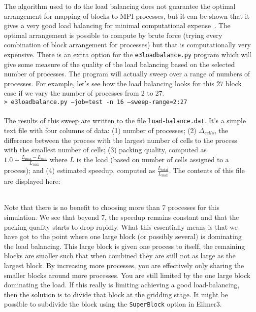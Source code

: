 The algorithm used to do the load balancing does not guarantee the
optimal arrangement for mapping of blocks to MPI processes,
but it can be shown that it gives a very good load balancing for
minimal computational expense~\cite{graham_1969}.
The optimal arrangement is possible to compute by brute force (trying
every combination of block arrangement for processes) but
that is computationally very expensive.
There is an extra option for the \texttt{e3loadbalance.py}
program which will give some measure of the quality of
the load balancing based on the selected number of
processes.
The program will actually sweep over a range of
numbers of processes.
For example, let's see how the load balancing looks
for this 27 block case if we vary the number
of processes from 2 to 27.
%
\topbar\\
\texttt{> e3loadbalance.py --job=test -n 16 --sweep-range=2:27}\\
\bottombar\\
%
The results of this sweep are written to the file \texttt{load-balance.dat}.
It's a simple text file with four columns of data:
(1) number of processes;
(2) $\Delta_{cells}$, the difference between
the process with the largest number of cells to the process
with the smallest number of cells;
(3) packing quality, computed as $1.0 - \frac{L_{\text{max}} - L_{\text{min}}}{L_{\text{max}}}$
where $L$ is the load (based on number of cells assigned to a process);
and (4) estimated speedup, computed as $\frac{L_{\text{total}}}{L_{\text{max}}}$.
The contents of this file are displayed here:\\
\topbar

\bottombar\\
Note that there is no benefit to choosing more than 7 processes for this simulation.
We see that beyond 7, the speedup remains constant and that
the packing quality starts to drop rapidly.
What this essentially means is that we have got to the point
where one large block (or possibly several) is dominating the
load balancing.
This large block is given one process to itself, the remaining
blocks are smaller such that when combined
they are still not as large as the largest block.
By increasing more processes, you are effectively only sharing
the smaller blocks around more processes.
You are still limited by the one large block dominating the load.
If this really is limiting achieving a good load-balancing, then
the solution is to divide that block at the gridding stage.
It might be possible to subdivide the block using
the \texttt{SuperBlock} option in Eilmer3.

